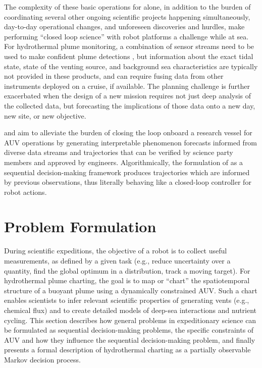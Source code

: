 The complexity of these basic operations for \Sentry alone, in addition to the burden of coordinating several other ongoing scientific projects happening simultaneously, day-to-day operational changes, and unforeseen discoveries and hurdles, make performing ``closed loop science'' with robot platforms a challenge while at sea. For hydrothermal plume monitoring, a combination of sensor streams need to be used to make confident plume detections \autocite{jakuba2007stochastic}, but information about the exact tidal state, state of the venting source, and background sea characteristics are typically not provided in these products, and can require fusing data from other instruments deployed on a cruise, if available. The planning challenge is further exacerbated when the design of a new mission requires not just deep analysis of the collected data, but forecasting the implications of those data onto a new day, new site, or new objective. 

\PHUMES and \PHORTEX aim to alleviate the burden of closing the loop onboard a research vessel for AUV operations by generating interpretable phenomenon forecasts informed from diverse data streams and trajectories that can be verified by science party members and approved by \Sentry engineers. Algorithmically, the formulation of \PHORTEX as a sequential decision-making framework produces trajectories which are informed by previous observations, thus literally behaving like a closed-loop controller for robot actions. %

\section{Problem Formulation}
\label{sec:problem}
During scientific expeditions, the objective of a robot is to collect useful measurements, as defined by a given task (e.g., reduce uncertainty over a quantity, find the global optimum in a distribution, track a moving target). For hydrothermal plume charting, the goal is to map or ``chart'' the spatiotemporal structure of a buoyant plume using a dynamically constrained AUV. Such a chart enables scientists to infer relevant scientific properties of generating vents (e.g., chemical flux) and to create detailed models of deep-sea interactions and nutrient cycling. This section describes how general problems in expeditionary science can be formulated as sequential decision-making problems, the specific constraints of AUV \Sentry and how they influence the sequential decision-making problem, and finally presents a formal description of hydrothermal charting as a partially observable Markov decision process. 

